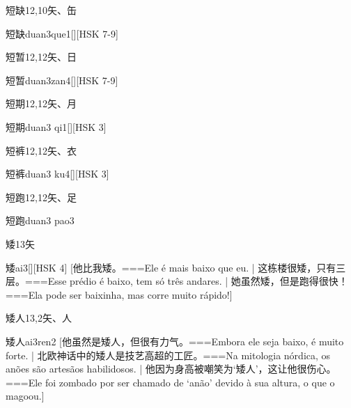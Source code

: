 \begin{Entry}{短缺}{12,10}{⽮、⽸}
  \begin{Phonetics}{短缺}{duan3que1}[][HSK 7-9]
  \end{Phonetics}
\end{Entry}

\begin{Entry}{短暂}{12,12}{⽮、⽇}
  \begin{Phonetics}{短暂}{duan3zan4}[][HSK 7-9]
  \end{Phonetics}
\end{Entry}

\begin{Entry}{短期}{12,12}{⽮、⽉}
  \begin{Phonetics}{短期}{duan3 qi1}[][HSK 3]
  \end{Phonetics}
\end{Entry}

\begin{Entry}{短裤}{12,12}{⽮、⾐}
  \begin{Phonetics}{短裤}{duan3 ku4}[][HSK 3]
  \end{Phonetics}
\end{Entry}

\begin{Entry}{短跑}{12,12}{⽮、⾜}
  \begin{Phonetics}{短跑}{duan3 pao3}
  \end{Phonetics}
\end{Entry}

\begin{Entry}{矮}{13}{⽮}
  \begin{Phonetics}{矮}{ai3}[][HSK 4]
    [他比我矮。===Ele é mais baixo que eu. | 这栋楼很矮，只有三层。===Esse prédio é baixo, tem só três andares. | 她虽然矮，但是跑得很快！===Ela pode ser baixinha, mas corre muito rápido!]
  \end{Phonetics}
\end{Entry}

\begin{Entry}{矮人}{13,2}{⽮、⼈}
  \begin{Phonetics}{矮人}{ai3ren2}
    [他虽然是矮人，但很有力气。===Embora ele seja baixo, é muito forte. | 北欧神话中的矮人是技艺高超的工匠。===Na mitologia nórdica, os anões são artesãos habilidosos. | 他因为身高被嘲笑为‘矮人’，这让他很伤心。===Ele foi zombado por ser chamado de ‘anão’ devido à sua altura, o que o magoou.]
  \end{Phonetics}
\end{Entry}

